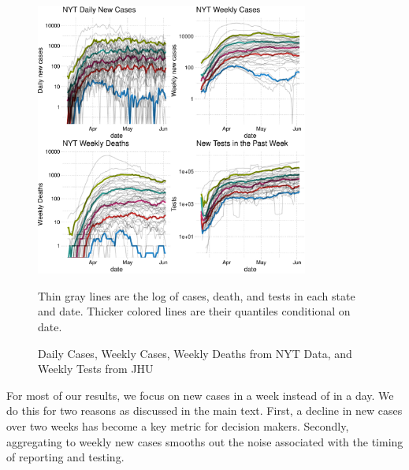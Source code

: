 \documentclass[3p, longtitle]{elsarticle}
\theoremstyle{definition}
\begin{document}
\begin{figure}[!ht]\caption{Daily Cases, Weekly Cases,  Weekly Deaths from NYT Data, and Weekly Tests from JHU\label{fig:casedeathtest}}\smallskip
  \centering
  \begin{minipage}{\textwidth}
    \centering
    \includegraphics[width=0.8\textwidth,height=0.7\textwidth]{tables_and_figures/casesdeaths_q}
  \end{minipage}
     \begin{flushleft}
      \footnotesize Thin gray lines are the log of cases, death, and tests  in each
      state and date. Thicker colored lines are their quantiles conditional on date.
      \end{flushleft}
\end{figure}





For most of our results, we focus on new cases in a week instead of in
a day. We do this for two reasons as discussed in the main text. First, a decline in new cases over
two weeks has become a key metric for decision makers. Secondly, aggregating to weekly new cases smooths out the noise associated with  the timing of
reporting and testing.
\end{document}
